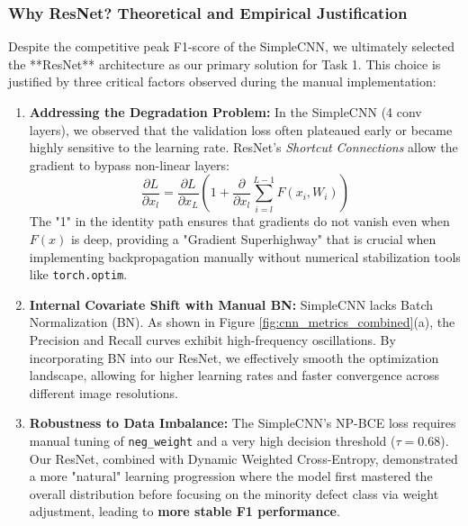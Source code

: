 \subsubsection{Why ResNet? Theoretical and Empirical Justification}
Despite the competitive peak F1-score of the SimpleCNN, we ultimately selected the **ResNet** architecture as our primary solution for Task 1. This choice is justified by three critical factors observed during the manual implementation:

\begin{enumerate}
    \item \textbf{Addressing the Degradation Problem:} In the SimpleCNN (4 conv layers), we observed that the validation loss often plateaued early or became highly sensitive to the learning rate. ResNet's \textit{Shortcut Connections} allow the gradient to bypass non-linear layers:
    \begin{equation}
        \frac{\partial L}{\partial x_l} = \frac{\partial L}{\partial x_L} \left( 1 + \frac{\partial}{\partial x_l} \sum_{i=l}^{L-1} F(x_i, W_i) \right)
    \end{equation}
    The "1" in the identity path ensures that gradients do not vanish even when $F(x)$ is deep, providing a "Gradient Superhighway" that is crucial when implementing backpropagation manually without numerical stabilization tools like \texttt{torch.optim}.

    \item \textbf{Internal Covariate Shift with Manual BN:} SimpleCNN lacks Batch Normalization (BN). As shown in Figure \ref{fig:cnn_metrics_combined}(a), the Precision and Recall curves exhibit high-frequency oscillations. By incorporating BN into our ResNet, we effectively smooth the optimization landscape, allowing for higher learning rates and faster convergence across different image resolutions.

    \item \textbf{Robustness to Data Imbalance:} The SimpleCNN's NP-BCE loss requires manual tuning of \texttt{neg\_weight} and a very high decision threshold ($\tau=0.68$). Our ResNet, combined with Dynamic Weighted Cross-Entropy, demonstrated a more "natural" learning progression where the model first mastered the overall distribution before focusing on the minority defect class via weight adjustment, leading to \textbf{more stable F1 performance}.
\end{enumerate}


